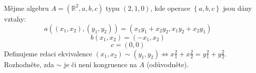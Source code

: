 \subsubsection{}
Mějme algebru $A=\left ( \mathbb{R}^{2},a,b,c \right )$ typu $(2,1,0)$, kde
operace $\left \{ a,b,c \right \}$ jsou dány vztahy:
$$a((x_{1},x_{2}),(y_{1},y_{2})) =
(x_{1}y_{1}+x_{2}y_{2},x_{1}y_{2}+x_{2}y_{1})$$
$$b(x_{1},x_{2}) = (-x_{1},x_{2})$$
$$c=(0,0)$$
Definujeme relaci ekvivalence $(x_{1},x_{2}) \sim (y_{1},y_{2}) \Leftrightarrow
x\tfrac{2}{1}+x\tfrac{2}{2}=y\tfrac{2}{1}+y\tfrac{2}{2}$. Rozhodněte, zda $\sim$
je či není kongruence na $A$ (odůvodněte).

